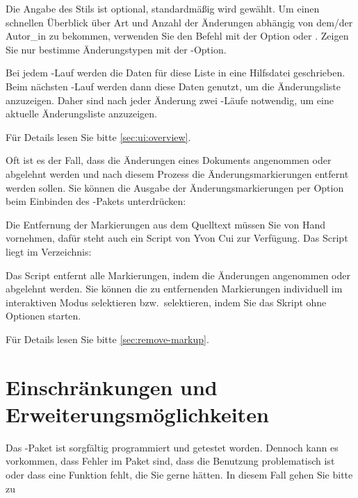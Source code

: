 Die Angabe des Stils ist optional, standardmäßig wird  gewählt.
Um einen schnellen Überblick über Art und Anzahl der Änderungen abhängig von dem/der Autor\_in zu bekommen, verwenden Sie den Befehl mit der Option  oder .
Zeigen Sie nur bestimme Änderungstypen mit der -Option.

Bei jedem -Lauf werden die Daten für diese Liste in eine Hilfsdatei geschrieben.
Beim nächsten -Lauf werden dann diese Daten genutzt, um die Änderungsliste anzuzeigen.
Daher sind nach jeder Änderung zwei -Läufe notwendig, um eine aktuelle Änderungsliste anzuzeigen.

Für Details lesen Sie bitte \autoref{sec:ui:overview}.


Oft ist es der Fall, dass die Änderungen eines Dokuments angenommen oder abgelehnt werden und nach diesem Prozess die Änderungsmarkierungen entfernt werden sollen.
Sie können die Ausgabe der Änderungsmarkierungen per Option beim Einbinden des -Pakets unterdrücken:


Die Entfernung der Markierungen aus dem Quelltext müssen Sie von Hand vornehmen, dafür steht auch ein Script von Yvon Cui zur Verfügung.
Das Script liegt im Verzeichnis:


Das Script entfernt alle Markierungen, indem die Änderungen angenommen oder abgelehnt werden.
Sie können die zu entfernenden Markierungen individuell im interaktiven Modus selektieren bzw.\ selektieren, indem Sie das Skript ohne Optionen starten.

Für Details lesen Sie bitte \autoref{sec:remove-markup}.



\cleardoublepage
\section{Einschränkungen und Erweiterungsmöglichkeiten}
\label{sec:limitations}

Das -Paket ist sorgfältig programmiert und getestet worden.
Dennoch kann es vorkommen, dass Fehler im Paket sind, dass die Benutzung problematisch ist oder dass eine Funktion fehlt, die Sie gerne hätten.
In diesem Fall gehen Sie bitte zu

